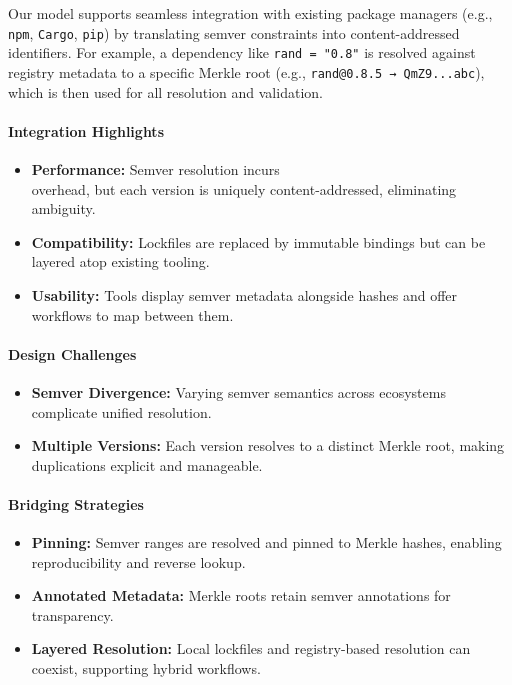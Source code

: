 \documentclass[sigplan,screen]{acmart}
\begin{document}
Our model supports seamless integration with existing package managers (e.g., \texttt{npm}, \texttt{Cargo}, \texttt{pip}) by translating semver constraints into content-addressed identifiers. For example, a dependency like \texttt{rand = "0.8"} is resolved against registry metadata to a specific Merkle root (e.g., \texttt{rand@0.8.5 → QmZ9...abc}), which is then used for all resolution and validation.

\paragraph{Integration Highlights}
\begin{itemize}
  \item \textbf{Performance:} Semver resolution incurs \\overhead, but each version is uniquely content-addressed, eliminating ambiguity.
  \item \textbf{Compatibility:} Lockfiles are replaced by immut\-able bindings but can be layered atop existing tooling.
  \item \textbf{Usability:} Tools display semver metadata alongside hashes and offer workflows to map between them.
\end{itemize}

\paragraph{Design Challenges}
\begin{itemize}
  \item \textbf{Semver Divergence:} Varying semver semantics across ecosystems complicate unified resolution.
  \item \textbf{Multiple Versions:} Each version resolves to a distinct Merkle root, making duplications explicit and manageable.
\end{itemize}

\paragraph{Bridging Strategies}
\begin{itemize}
  \item \textbf{Pinning:} Semver ranges are resolved and pinned to Merkle hashes, enabling reproducibility and reverse lookup.
  \item \textbf{Annotated Metadata:} Merkle roots retain semver annotations for transparency.
  \item \textbf{Layered Resolution:} Local lockfiles and registry-based resolution can coexist, supporting hybrid workflows.
\end{itemize}
\end{document}
